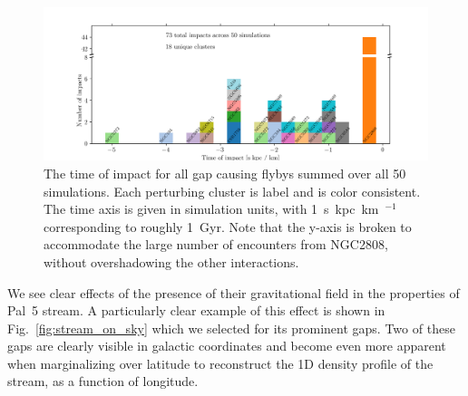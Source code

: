 \documentclass{aa}
\begin{document}
    \begin{figure}
      \centering
      \includegraphics[width=\linewidth]{histogram_impact_time.png}
      \caption{The time of impact for all gap causing flybys summed over all 50 simulations. Each perturbing cluster is label and is color consistent. The time axis is given in simulation units, with 1~s~kpc~km~$^{-1}$ corresponding to roughly 1~Gyr. Note that the y-axis is broken to accommodate the large number of encounters from NGC2808, without overshadowing the other interactions.}
      \label{fig:histogram_impact_time}
    \end{figure}

    
    We see clear effects of the presence of their gravitational field in the properties of Pal~5 stream. A particularly clear example of this effect is shown in Fig.~\ref{fig:stream_on_sky} which we selected for its prominent gaps. Two of these gaps are clearly visible in galactic coordinates and become even more apparent when marginalizing over latitude to reconstruct the 1D density profile of the stream, as a function of longitude.     
\end{document}
